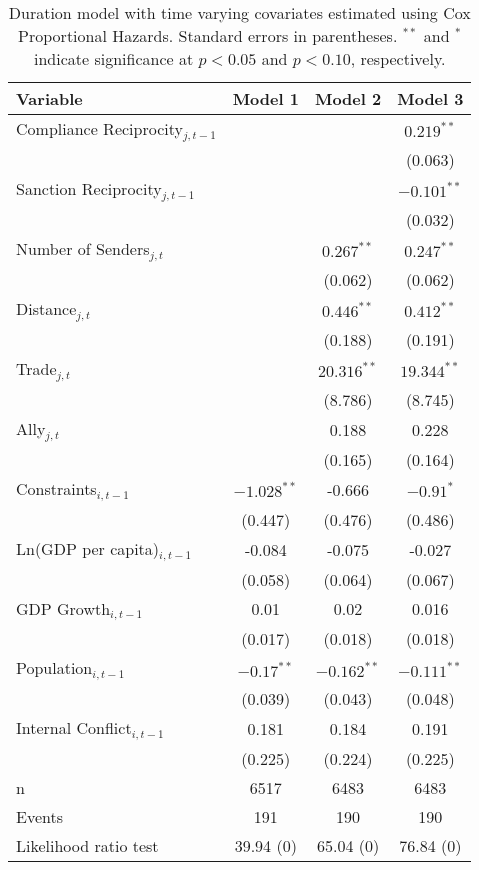 \begin{table}[ht]
\centering
{\normalsize
\begin{tabular}{lccc}
 Variable & Model 1 & Model 2 & Model 3 \\ 
  \hline
\hline
Compliance Reciprocity$_{j,t-1}$ &  &  & $0.219^{\ast\ast}$ \\ 
   &  &  & (0.063) \\ 
  Sanction Reciprocity$_{j,t-1}$ &  &  & $-0.101^{\ast\ast}$ \\ 
   &  &  & (0.032) \\ 
   \hline
Number of Senders$_{j,t}$ &  & $0.267^{\ast\ast}$ & $0.247^{\ast\ast}$ \\ 
   &  & (0.062) & (0.062) \\ 
  Distance$_{j,t}$ &  & $0.446^{\ast\ast}$ & $0.412^{\ast\ast}$ \\ 
   &  & (0.188) & (0.191) \\ 
  Trade$_{j,t}$ &  & $20.316^{\ast\ast}$ & $19.344^{\ast\ast}$ \\ 
   &  & (8.786) & (8.745) \\ 
  Ally$_{j,t}$ &  & 0.188 & 0.228 \\ 
   &  & (0.165) & (0.164) \\ 
   \hline
Constraints$_{i,t-1}$ & $-1.028^{\ast\ast}$ & -0.666 & $-0.91^{\ast}$ \\ 
   & (0.447) & (0.476) & (0.486) \\ 
  Ln(GDP per capita)$_{i,t-1}$ & -0.084 & -0.075 & -0.027 \\ 
   & (0.058) & (0.064) & (0.067) \\ 
  GDP Growth$_{i,t-1}$ & 0.01 & 0.02 & 0.016 \\ 
   & (0.017) & (0.018) & (0.018) \\ 
  Population$_{i,t-1}$ & $-0.17^{\ast\ast}$ & $-0.162^{\ast\ast}$ & $-0.111^{\ast\ast}$ \\ 
   & (0.039) & (0.043) & (0.048) \\ 
  Internal Conflict$_{i,t-1}$ & 0.181 & 0.184 & 0.191 \\ 
   & (0.225) & (0.224) & (0.225) \\ 
   \hline
n & 6517 & 6483 & 6483 \\ 
  Events & 191 & 190 & 190 \\ 
  Likelihood ratio test & 39.94 (0) & 65.04 (0) & 76.84 (0) \\ 
   \hline
\hline
\end{tabular}
}
\caption{Duration model with time varying covariates estimated using Cox Proportional Hazards. Standard errors in parentheses. $^{**}$ and $^{*}$ indicate significance at $p< 0.05 $ and $p< 0.10 $, respectively.} 
\label{tab:regResults}
\end{table}
